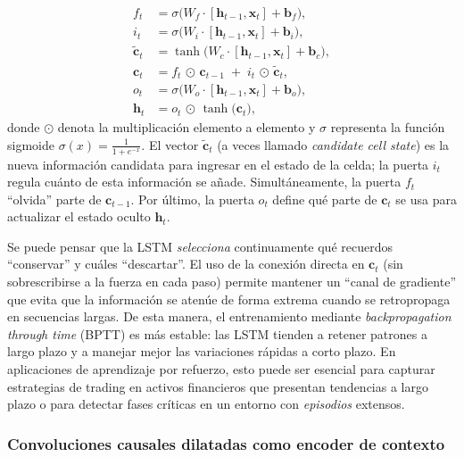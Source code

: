 \documentclass[11pt,a4paper,spanish]{article}
\numberwithin{equation}{section} %
\begin{document}
\begin{align}
    f_t &= \sigma\!\bigl(W_f \cdot [\mathbf{h}_{t-1}, \mathbf{x}_t] + \mathbf{b}_f\bigr), \\
    i_t &= \sigma\!\bigl(W_i \cdot [\mathbf{h}_{t-1}, \mathbf{x}_t] + \mathbf{b}_i\bigr), \\
    \tilde{\mathbf{c}}_t &= \tanh\!\bigl(W_c \cdot [\mathbf{h}_{t-1}, \mathbf{x}_t] + \mathbf{b}_c\bigr), \\
    \mathbf{c}_t &= f_t \,\odot\, \mathbf{c}_{t-1} \;+\; i_t \,\odot\, \tilde{\mathbf{c}}_t, \\
    o_t &= \sigma\!\bigl(W_o \cdot [\mathbf{h}_{t-1}, \mathbf{x}_t] + \mathbf{b}_o\bigr), \\
    \mathbf{h}_t &= o_t \,\odot\, \tanh\!\bigl(\mathbf{c}_t\bigr),
\end{align}
donde \(\odot\) denota la multiplicación elemento a elemento y \(\sigma\) representa la función sigmoide \(\sigma(x) = \tfrac{1}{1 + e^{-x}}\). El vector \(\tilde{\mathbf{c}}_t\) (a veces llamado \emph{candidate cell state}) es la nueva información candidata para ingresar en el estado de la celda; la puerta \(i_t\) regula cuánto de esta información se añade. Simultáneamente, la puerta \(f_t\) “olvida” parte de \(\mathbf{c}_{t-1}\). Por último, la puerta \(o_t\) define qué parte de \(\mathbf{c}_t\) se usa para actualizar el estado oculto \(\mathbf{h}_t\).

Se puede pensar que la LSTM \emph{selecciona} continuamente qué recuerdos “conservar” y cuáles “descartar”. El uso de la conexión directa en \(\mathbf{c}_t\) (sin sobrescribirse a la fuerza en cada paso) permite mantener un “canal de gradiente” que evita que la información se atenúe de forma extrema cuando se retropropaga en secuencias largas. De esta manera, el entrenamiento mediante \emph{backpropagation through time} (BPTT) es más estable: las LSTM tienden a retener patrones a largo plazo y a manejar mejor las variaciones rápidas a corto plazo. En aplicaciones de aprendizaje por refuerzo, esto puede ser esencial para capturar estrategias de trading en activos financieros que presentan tendencias a largo plazo o para detectar fases críticas en un entorno con \emph{episodios} extensos.



\subsubsection{Convoluciones causales dilatadas como encoder de contexto}
\label{subsubsec:conv1d_encoder}
\end{document}
